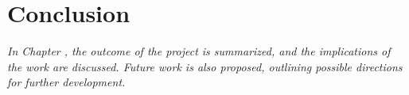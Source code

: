 \chapter{Conclusion}
\label{chapter:conclusion}

\textit{In Chapter \thechapter, the outcome of the project is summarized, and the implications of the work are discussed. Future work is also proposed, outlining possible directions for further development.}



